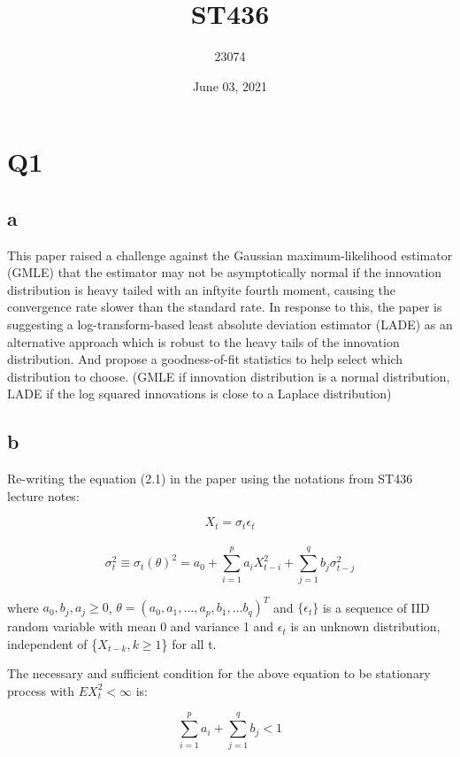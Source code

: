 \documentclass[
  11pt,
]{article}
\title{ST436}
\author{23074}
\date{June 03, 2021}
\begin{document}
\maketitle

{
\setcounter{tocdepth}{3}
\tableofcontents
}
\hypertarget{q1}{%
\section{Q1}\label{q1}}

\hypertarget{a}{%
\subsection{a}\label{a}}

This paper raised a challenge against the Gaussian maximum-likelihood
estimator (GMLE) that the estimator may not be asymptotically normal if
the innovation distribution is heavy tailed with an inftyite fourth
moment, causing the convergence rate slower than the standard rate. In
response to this, the paper is suggesting a log-transform-based least
absolute deviation estimator (LADE) as an alternative approach which is
robust to the heavy tails of the innovation distribution. And propose a
goodness-of-fit statistics to help select which distribution to choose.
(GMLE if innovation distribution is a normal distribution, LADE if the
log squared innovations is close to a Laplace distribution)

\hypertarget{b}{%
\subsection{b}\label{b}}

Re-writing the equation (2.1) in the paper using the notations from
ST436 lecture notes:

\[ X_t = \sigma_{t}\epsilon_{t}\]\\
\[ \sigma^2_{t}\equiv\sigma_t(\theta)^2=a_0+\sum^{p}_{i=1}a_{i}X^2_{t-i}+\sum^{q}_{j=1}b_{j}\sigma^2_{t-j} \]

where \(a_0,b_j,a_j \ge 0\), \(\theta=(a_0,a_1,...,a_p,b_1,...b_q)^T\)
and \(\{\epsilon_t\}\) is a sequence of IID random variable with mean 0
and variance 1 and \(\epsilon_t\) is an unknown distribution,
independent of \{\(X_{t-k},k\ge1\)\} for all t.

The necessary and sufficient condition for the above equation to be
stationary process with \(EX_t^2<\infty\) is:

\[\sum_{i=1}^p a_i + \sum_{j=1}^q b_j < 1\]
\end{document}
